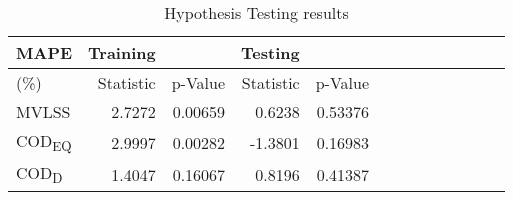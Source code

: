 \begin{longtable}[h]{@{}l *{6}{rr}}
\caption[Hypothesis Testing results]{Hypothesis Testing results}
\label{t:Ttest}
\\
%   
\toprule%


 {\bfseries MAPE } & {\bfseries Training} & ~ & {\bfseries Testing} & ~
\\

\cmidrule[0.4pt](r{0.125em}){1-1}%
\cmidrule[0.4pt](lr{0.125em}){2-3}%
\cmidrule[0.4pt](lr{0.125em}){4-5}%



  \endfirsthead

\endhead


        (\%) & Statistic & p-Value  & Statistic  & p-Value  \\ 
        \hline
        MVLSS  & 2.7272  & 0.00659 & 0.6238  & 0.53376 \\ 
        COD\textsubscript{EQ}  & 2.9997  & 0.00282  & -1.3801  & 0.16983\\ 
        COD\textsubscript{D} & 1.4047  & 0.16067  & 0.8196  & 0.41387\\ 


\bottomrule

\end{longtable}